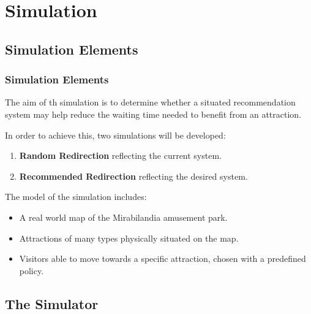 \section{Simulation}\label{sec:simulation}
\frame{\tableofcontents[currentsection]}

\subsection{Simulation Elements}\label{subsec:simulation-elements}

\begin{frame}
    \frametitle{Simulation Elements}
    The aim of th simulation is to determine whether a situated recommendation system may help reduce the waiting time needed to benefit from an attraction.

    \bigskip

    In order to achieve this, two simulations will be developed:
    \begin{enumerate}
        \item \textbf{Random Redirection} reflecting the current system.
        \item \textbf{Recommended Redirection} reflecting the desired system.
    \end{enumerate}

    \bigskip

    The model of the simulation includes:
    \begin{itemize}
        \item A real world map of the Mirabilandia amusement park.
        \item Attractions of many types physically situated on the map.
        \item Visitors able to move towards a specific attraction, chosen with a predefined policy.
    \end{itemize}

\end{frame}

\subsection{The Simulator}\label{subsec:the-simulator}

